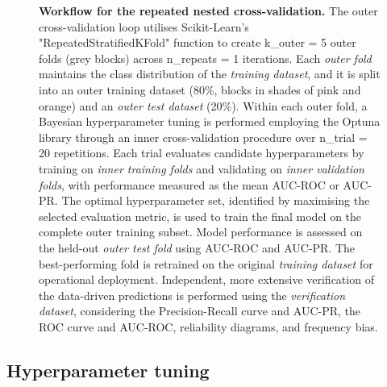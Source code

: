 \begin{figure}[htbp]
\caption{\textbf{Workflow for the repeated nested cross-validation.} The outer cross-validation loop utilises Scikit-Learn's "RepeatedStratifiedKFold" function to create k\_outer = 5 outer folds (grey blocks) across n\_repeats = 1 iterations. Each \textcolor{colourOuterFolds}{\textit{outer fold}} maintains the class distribution of the \textcolor{colourTraining}{\textit{training dataset}}, and it is split into an outer training dataset (80\%, blocks in shades of pink and orange) and an \textcolor{colourOuterTest}{\textit{outer test dataset}} (20\%). Within each outer fold, a Bayesian hyperparameter tuning is performed employing the Optuna library through an inner cross-validation procedure over n\_trial = 20 repetitions. Each trial evaluates candidate hyperparameters by training on \textcolor{colourInnerTraining}{\textit{inner training folds}} and validating on \textcolor{colourInnerValidation}{\textit{inner validation folds}}, with performance measured as the mean AUC-ROC or AUC-PR. The optimal hyperparameter set, identified by maximising the selected evaluation metric, is used to train the final model on the complete outer training subset. Model performance is assessed on the held-out \textcolor{colourOuterTest}{\textit{outer test fold}} using AUC-ROC and AUC-PR. The best-performing fold is retrained on the original \textcolor{colourTraining}{\textit{training dataset}} for operational deployment. Independent, more extensive verification of the data-driven predictions is performed using the \textcolor{colourTest}{\textit{verification dataset}}, considering the Precision-Recall curve and AUC-PR, the ROC curve and AUC-ROC, reliability diagrams, and frequency bias.}
\label{fig:cv_optuna}
\end{figure}


\subsection{Hyperparameter tuning}

